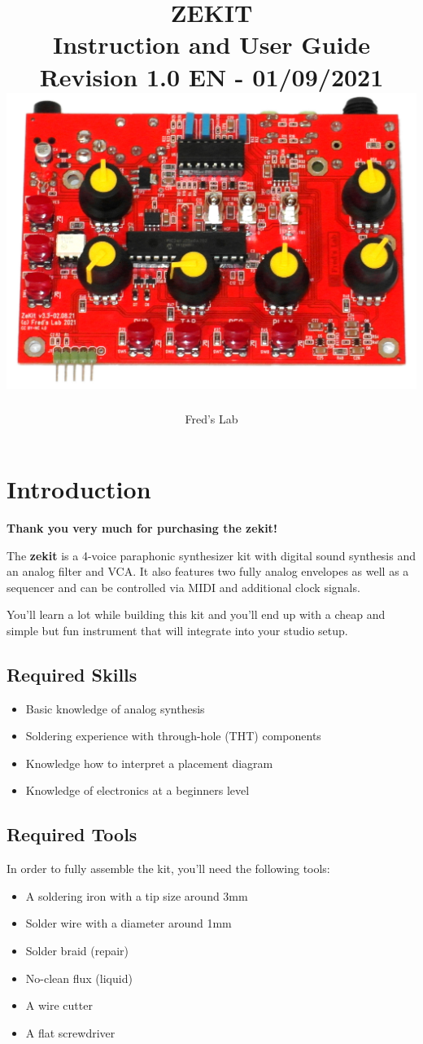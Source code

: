 \documentclass{scrartcl}
\title{
    \vspace*{4cm}
    \huge{ZEKIT} \\
    Instruction and User Guide \\
    \vspace*{0.25cm}
    \small{Revision 1.0 EN - 01/09/2021} \\
    \vspace*{0.5cm}
    \includegraphics[scale=0.2]{assets/zekit-assembled.jpg}
}
\author{Fred's Lab}
\begin{document}
\maketitle

\pagebreak


\tableofcontents
\pagebreak


\section{Introduction}

\textbf{Thank you very much for purchasing the zekit!}

The \textbf{zekit} is a 4-voice paraphonic synthesizer kit with digital sound synthesis and an analog filter and VCA. It also features two fully analog envelopes as well as a sequencer and can be controlled via MIDI and additional clock signals.

You'll learn a lot while building this kit and you'll end up with a cheap and simple but fun instrument that will integrate into your studio setup.

\subsection{Required Skills}

\begin{itemize}
    \item Basic knowledge of analog synthesis
    \item Soldering experience with through-hole (THT) components
    \item Knowledge how to interpret a placement diagram
    \item Knowledge of electronics at a beginners level
\end{itemize}

\subsection{Required Tools}

In order to fully assemble the kit, you'll need the following tools:

\begin{itemize}
    \item A soldering iron with a tip size around 3mm
    \item Solder wire with a diameter around 1mm
    \item Solder braid (repair)
    \item No-clean flux (liquid)
    \item A wire cutter
    \item A flat screwdriver
\end{itemize}
\end{document}
